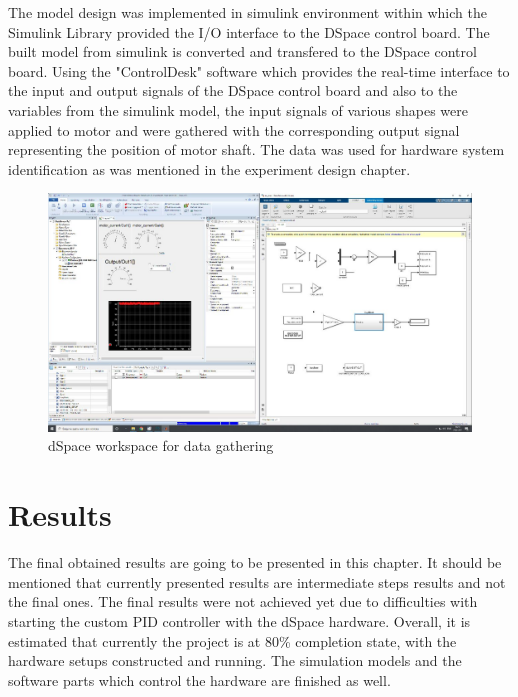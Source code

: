 \documentclass[]{final_report}
\begin{document}
The model design was implemented in simulink environment within which the Simulink Library provided the I/O interface to the DSpace control board. The built model from simulink is converted and transfered to the DSpace control board. Using the "ControlDesk" software which provides the real-time interface to the input and output signals of the DSpace control board and also to the variables from the simulink model, the input signals of various shapes were applied to motor and were gathered with the corresponding output signal representing the position of motor shaft. The data was used for hardware system identification as was mentioned in the experiment design chapter.

\begin{figure} [h!]
\centerline{\includegraphics[width=.75\textwidth]{Screenshots for paper/dSpace/photo_2021-03-09 11.37.29.jpeg}}
\caption{dSpace workspace for data gathering}
\label{fig:dSpaceEx1}
\end{figure}







\chapter{Results}
The final obtained results are going to be presented in this chapter. It should be mentioned that currently presented results are intermediate steps results and not the final ones. The final results were not achieved yet due to difficulties with starting the custom PID controller with the dSpace hardware. Overall, it is estimated that currently the project is at 80\% completion state, with the hardware setups constructed and running. The simulation models and the software parts which control the hardware are finished as well. 
\end{document}

